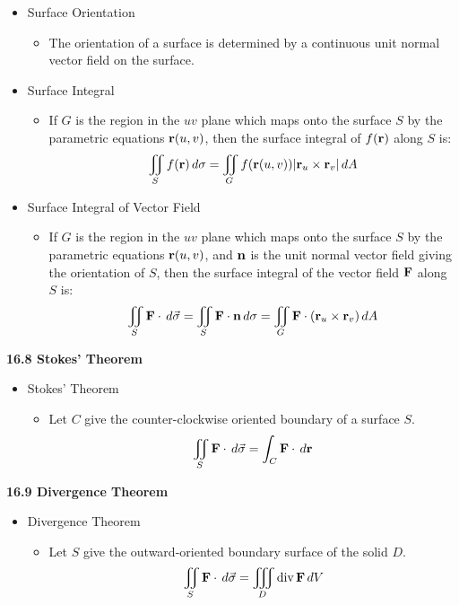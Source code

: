   \begin{itemize}

    \item Surface Orientation
      \begin{itemize}
        \item The orientation of a surface is determined by a continuous unit normal vector field on the surface.
      \end{itemize}

    \item Surface Integral
      \begin{itemize}
        \item If $G$ is the region in the $uv$ plane which maps onto the surface $S$ by the parametric equations $\mathbf{r}(u,v)$, then the surface integral of $f(\mathbf{r})$ along $S$ is:
          \[
            \iint_S f(\mathbf{r})\,d{\sigma} = \iint_G f(\mathbf{r}(u,v))|\mathbf{r}_u\times\mathbf{r}_v|\,d{A}
          \]
      \end{itemize}

    \item Surface Integral of Vector Field
      \begin{itemize}
        \item If $G$ is the region in the $uv$ plane which maps onto the surface $S$ by the parametric equations $\mathbf{r}(u,v)$, and $\mathbf{n}$ is the unit normal vector field giving the orientation of $S$, then the surface integral of the vector field $\mathbf{F}$ along $S$ is:
          \[
            \iint_S \mathbf{F}\cdot\,d{\vec\sigma} = \iint_S \mathbf{F}\cdot\mathbf{n}\,d{\sigma} = \iint_G \mathbf{F}\cdot(\mathbf{r}_u\times\mathbf{r}_v)\,d{A}
          \]
      \end{itemize}
  \end{itemize}

\newpage

\centerline{\bf 16.8 Stokes' Theorem}
  \begin{itemize}
  \item Stokes' Theorem
    \begin{itemize}
    \item Let $C$ give the counter-clockwise oriented boundary of a surface $S$.
    \[
      \iint_S \mathbf{F}\cdot\,d{\vec\sigma} = \int_C \mathbf{F}\cdot\,d{\mathbf{r}}
    \]
    \end{itemize}
  \end{itemize}

\hr

\centerline{\bf 16.9 Divergence Theorem}
  \begin{itemize}
  \item Divergence Theorem
    \begin{itemize}
    \item Let $S$ give the outward-oriented boundary surface of the solid $D$.
    \[
      \iint_S \mathbf{F}\cdot\,d{\vec\sigma} = \iiint_D \textrm{div}\,{\mathbf{F}}\,d{V}
    \]
    \end{itemize}
  \end{itemize}
  
